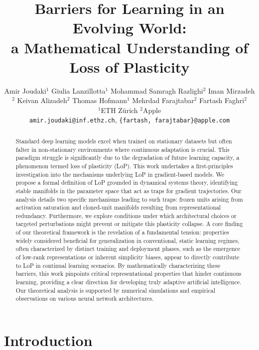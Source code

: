 \documentclass{article}
\title{Barriers for Learning in an Evolving World: \\a Mathematical Understanding of Loss of Plasticity}
\author{%
  Amir Joudaki$^{1}$ \And
  Giulia Lanzillotta$^{1}$ \And
  Mohammad Samragh Razlighi$^{2}$ \And
  Iman Mirzadeh$^{2}$ \And
  Keivan Alizadeh$^{2}$ \And
  Thomas Hofmann$^{1}$ \And
  Mehrdad Farajtabar$^{2}$ \And
  Fartash Faghri$^{2}$ %
  \\
  $^{1}$ETH Zürich
  $^{2}$Apple \\
  \texttt{amir.joudaki@inf.ethz.ch},
  \texttt{\{fartash, farajtabar\}@apple.com}
}
\begin{document}
\maketitle


\begin{abstract}
    Standard deep learning models excel when trained on stationary datasets but often falter in non-stationary environments where continuous adaptation is crucial. This paradigm struggle is significantly due to the degradation of future learning capacity, a phenomenon termed loss of plasticity (LoP). This work undertakes a first-principles investigation into the mechanisms underlying LoP in gradient-based models. We propose a formal definition of LoP grounded in dynamical systems theory, identifying stable manifolds in the parameter space that act as traps for gradient trajectories. Our analysis details two specific mechanisms leading to such traps: frozen units arising from activation saturation and cloned-unit manifolds resulting from representational redundancy. Furthermore, we explore conditions under which architectural choices or targeted perturbations might prevent or mitigate this plasticity collapse. 
    A core finding of our theoretical framework is the revelation of a fundamental tension: properties widely considered beneficial for generalization in conventional, static learning regimes, often characterized by distinct training and deployment phases, such as the emergence of low-rank representations or inherent simplicity biases, appear to directly contribute to LoP in continual learning scenarios. 
    By mathematically characterizing these barriers, this work pinpoints critical representational properties that hinder continuous learning, providing a clear direction for developing truly adaptive artificial intelligence. 
    Our theoretical analysis is supported by numerical simulations and empirical observations on various neural network architectures.
\end{abstract}

\section{Introduction}
\end{document}
